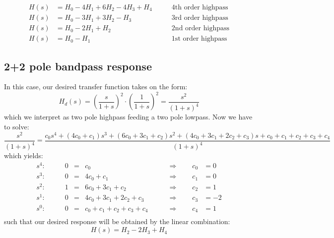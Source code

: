\begin{equation}
 \boxed
 {
  \begin{aligned}
   H(s) &= H_0 - 4 H_1 + 6 H_2 - 4 H_3 + H_4 \qquad & \text{4th order highpass} \\ 
   H(s) &= H_0 - 3 H_1 + 3 H_2 - H_3         \qquad & \text{3rd order highpass} \\
   H(s) &= H_0 - 2 H_1 + H_2                 \qquad & \text{2nd order highpass} \\ 
   H(s) &= H_0 - H_1                         \qquad & \text{1st order highpass}
  \end{aligned}
 }
\end{equation}

\subsection{2+2 pole bandpass response}
In this case, our desired transfer function takes on the form:
\begin{equation}
 H_d(s) = \left( \frac{s}{1+s} \right)^2 \cdot \left( \frac{1}{1+s} \right)^2 = \frac{s^2}{(1+s)^4}
\end{equation}
which we interpret as two pole highpass feeding a two pole lowpass. Now we have to solve:
\begin{equation}
 \frac{s^2}{(1+s)^4}
 = \frac{c_0 s^4 + (4c_0+c_1)s^3 + (6c_0+3c_1+c_2)s^2 + (4c_0+3c_1+2c_2+c_3)s + c_0+c_1+c_2+c_3+c_4}{(1+s)^4}
\end{equation}
which yields:
\begin{equation}
 \begin{aligned}
   s^4: \qquad & 0 &=& c_0                    \qquad & \Rightarrow \qquad c_0 &= 0   \\
   s^3: \qquad & 0 &=& 4c_0+c_1               \qquad & \Rightarrow \qquad c_1 &= 0   \\
   s^2: \qquad & 1 &=& 6c_0+3c_1+c_2          \qquad & \Rightarrow \qquad c_2 &= 1   \\ 
   s^1: \qquad & 0 &=& 4c_0+3c_1+2c_2+c_3     \qquad & \Rightarrow \qquad c_3 &= -2  \\    
   s^0: \qquad & 0 &=&  c_0+c_1+c_2+c_3+c_4   \qquad & \Rightarrow \qquad c_4 &= 1   \\      
 \end{aligned}
\end{equation}
such that our desired response will be obtained by the linear combination:
\begin{equation}
 H(s) = H_2 - 2 H_3 + H_4
\end{equation}
